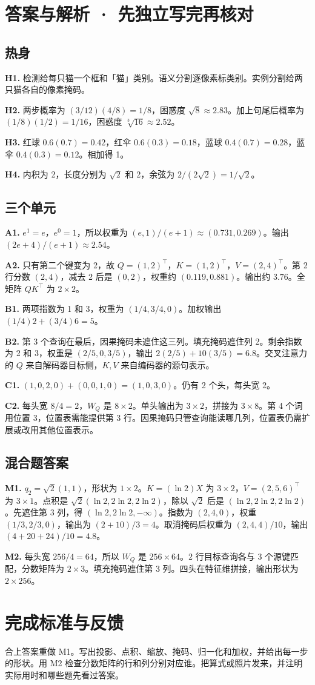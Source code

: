 \documentclass[UTF8,a4paper,11pt]{ctexart}
\begin{document}
\section{答案与解析 · 先独立写完再核对}
\subsection{热身}
\textbf{H1.} 检测给每只猫一个框和「猫」类别。语义分割逐像素标类别。实例分割给两只猫各自的像素掩码。

\textbf{H2.} 两步概率为 $(3/12)(4/8)=1/8$，困惑度 $\sqrt8\approx2.83$。加上句尾后概率为 $(1/8)(1/2)=1/16$，困惑度 $\sqrt[3]{16}\approx2.52$。

\textbf{H3.} 红球 $0.6(0.7)=0.42$，红伞 $0.6(0.3)=0.18$，蓝球 $0.4(0.7)=0.28$，蓝伞 $0.4(0.3)=0.12$。相加得 1。

\textbf{H4.} 内积为 2，长度分别为 $\sqrt2$ 和 2，余弦为 $2/(2\sqrt2)=1/\sqrt2$。

\subsection{三个单元}
\textbf{A1.} $e^1=e$，$e^0=1$，所以权重为 $(e,1)/(e+1)\approx(0.731,0.269)$。输出 $(2e+4)/(e+1)\approx2.54$。

\textbf{A2.} 只有第二个键变为 2，故 $Q=(1,2)^\top$，$K=(1,2)^\top$，$V=(2,4)^\top$。第 2 行分数 $(2,4)$，减去 2 后是 $(0,2)$，权重约 $(0.119,0.881)$。输出约 $3.76$。全矩阵 $QK^\top$ 为 $2\times2$。

\textbf{B1.} 两项指数为 1 和 3，权重为 $(1/4,3/4,0)$。加权输出 $(1/4)2+(3/4)6=5$。

\textbf{B2.} 第 3 个查询在最后，因果掩码未遮住这三列。填充掩码遮住列 2。剩余指数为 2 和 3，权重是 $(2/5,0,3/5)$，输出 $2(2/5)+10(3/5)=6.8$。交叉注意力的 $Q$ 来自解码器目标侧，$K,V$ 来自编码器的源句表示。

\textbf{C1.} $(1,0,2,0)+(0,0,1,0)=(1,0,3,0)$。仍有 2 个头，每头宽 2。

\textbf{C2.} 每头宽 $8/4=2$，$W_Q$ 是 $8\times2$。单头输出为 $3\times2$，拼接为 $3\times8$。第 4 个词用位置 3，位置表需能提供第 3 行。因果掩码只管查询能读哪几列，位置表仍需扩展或改用其他位置表示。

\clearpage
\subsection{混合题答案}
\textbf{M1.} $q_2=\sqrt2(1,1)$，形状为 $1\times2$。$K=(\ln2)X$ 为 $3\times2$，$V=(2,5,6)^\top$ 为 $3\times1$。点积是 $\sqrt2(\ln2,2\ln2,2\ln2)$，除以 $\sqrt2$ 后是 $(\ln2,2\ln2,2\ln2)$。先遮住第 3 列，得 $(\ln2,2\ln2,-\infty)$。指数为 $(2,4,0)$，权重 $(1/3,2/3,0)$，输出为 $(2+10)/3=4$。取消掩码后权重为 $(2,4,4)/10$，输出 $(4+20+24)/10=4.8$。

\textbf{M2.} 每头宽 $256/4=64$，所以 $W_Q$ 是 $256\times64$。2 行目标查询各与 3 个源键匹配，分数矩阵为 $2\times3$。填充掩码遮住第 3 列。四头在特征维拼接，输出形状为 $2\times256$。

\section{完成标准与反馈}
合上答案重做 M1。写出投影、点积、缩放、掩码、归一化和加权，并给出每一步的形状。用 M2 检查分数矩阵的行和列分别对应谁。把算式或照片发来，并注明实际用时和哪些题先看过答案。
\end{document}
